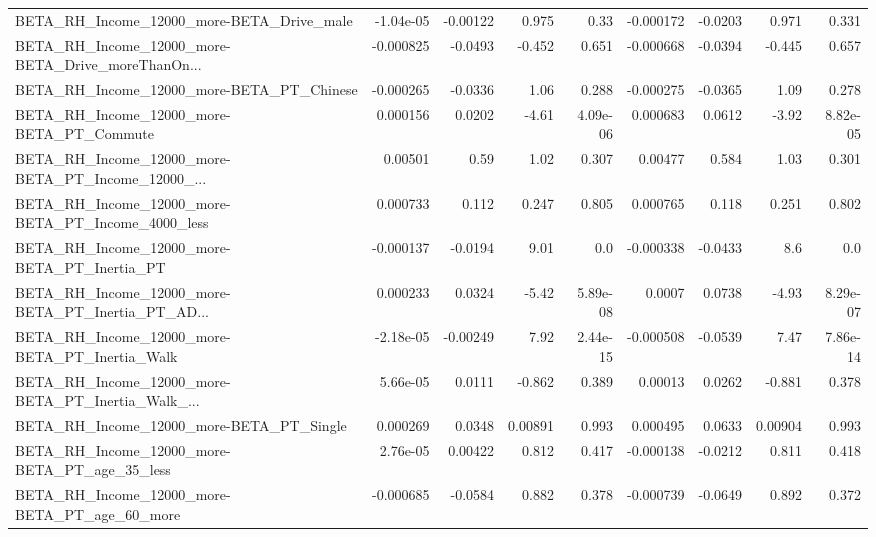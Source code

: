 \begin{tabular}{lrrrrrrrr}
BETA\_RH\_Income\_12000\_more-BETA\_Drive\_male          &   -1.04e-05 &     -0.00122 &    0.975 &     0.33 &  -0.000172 &     -0.0203 &        0.971 &         0.331 \\
BETA\_RH\_Income\_12000\_more-BETA\_Drive\_moreThanOn... &   -0.000825 &      -0.0493 &   -0.452 &    0.651 &  -0.000668 &     -0.0394 &       -0.445 &         0.657 \\
BETA\_RH\_Income\_12000\_more-BETA\_PT\_Chinese          &   -0.000265 &      -0.0336 &     1.06 &    0.288 &  -0.000275 &     -0.0365 &         1.09 &         0.278 \\
BETA\_RH\_Income\_12000\_more-BETA\_PT\_Commute          &    0.000156 &       0.0202 &    -4.61 & 4.09e-06 &   0.000683 &      0.0612 &        -3.92 &      8.82e-05 \\
BETA\_RH\_Income\_12000\_more-BETA\_PT\_Income\_12000\_... &     0.00501 &         0.59 &     1.02 &    0.307 &    0.00477 &       0.584 &         1.03 &         0.301 \\
BETA\_RH\_Income\_12000\_more-BETA\_PT\_Income\_4000\_less &    0.000733 &        0.112 &    0.247 &    0.805 &   0.000765 &       0.118 &        0.251 &         0.802 \\
BETA\_RH\_Income\_12000\_more-BETA\_PT\_Inertia\_PT       &   -0.000137 &      -0.0194 &     9.01 &      0.0 &  -0.000338 &     -0.0433 &          8.6 &           0.0 \\
BETA\_RH\_Income\_12000\_more-BETA\_PT\_Inertia\_PT\_AD... &    0.000233 &       0.0324 &    -5.42 & 5.89e-08 &     0.0007 &      0.0738 &        -4.93 &      8.29e-07 \\
BETA\_RH\_Income\_12000\_more-BETA\_PT\_Inertia\_Walk     &   -2.18e-05 &     -0.00249 &     7.92 & 2.44e-15 &  -0.000508 &     -0.0539 &         7.47 &      7.86e-14 \\
BETA\_RH\_Income\_12000\_more-BETA\_PT\_Inertia\_Walk\_... &    5.66e-05 &       0.0111 &   -0.862 &    0.389 &    0.00013 &      0.0262 &       -0.881 &         0.378 \\
BETA\_RH\_Income\_12000\_more-BETA\_PT\_Single           &    0.000269 &       0.0348 &  0.00891 &    0.993 &   0.000495 &      0.0633 &      0.00904 &         0.993 \\
BETA\_RH\_Income\_12000\_more-BETA\_PT\_age\_35\_less      &    2.76e-05 &      0.00422 &    0.812 &    0.417 &  -0.000138 &     -0.0212 &        0.811 &         0.418 \\
BETA\_RH\_Income\_12000\_more-BETA\_PT\_age\_60\_more      &   -0.000685 &      -0.0584 &    0.882 &    0.378 &  -0.000739 &     -0.0649 &        0.892 &         0.372 \\

\end{tabular}
